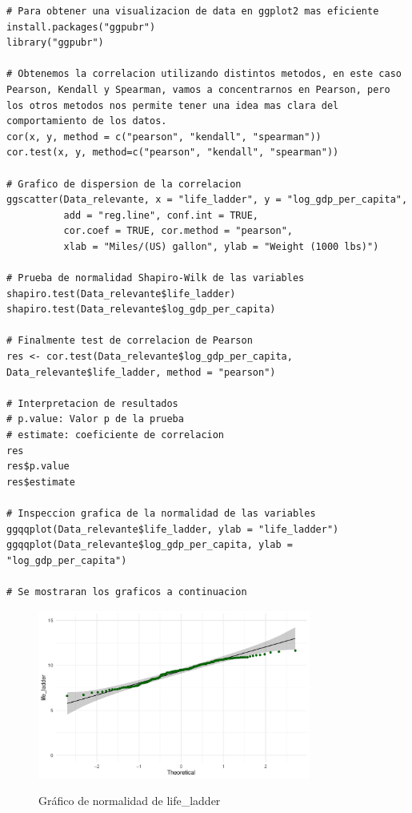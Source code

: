 \begin{enumerate}
\pagebreak

\begin{lstlisting}[caption={Pruebas sobre el coeficiente de correlación lineal de Pearson}, label=lst:rchunk1]
# Para obtener una visualizacion de data en ggplot2 mas eficiente
install.packages("ggpubr")
library("ggpubr")

# Obtenemos la correlacion utilizando distintos metodos, en este caso Pearson, Kendall y Spearman, vamos a concentrarnos en Pearson, pero los otros metodos nos permite tener una idea mas clara del comportamiento de los datos.
cor(x, y, method = c("pearson", "kendall", "spearman"))
cor.test(x, y, method=c("pearson", "kendall", "spearman"))

# Grafico de dispersion de la correlacion
ggscatter(Data_relevante, x = "life_ladder", y = "log_gdp_per_capita", 
          add = "reg.line", conf.int = TRUE, 
          cor.coef = TRUE, cor.method = "pearson",
          xlab = "Miles/(US) gallon", ylab = "Weight (1000 lbs)")

# Prueba de normalidad Shapiro-Wilk de las variables
shapiro.test(Data_relevante$life_ladder) 
shapiro.test(Data_relevante$log_gdp_per_capita)

# Finalmente test de correlacion de Pearson
res <- cor.test(Data_relevante$log_gdp_per_capita, Data_relevante$life_ladder, method = "pearson")

# Interpretacion de resultados
# p.value: Valor p de la prueba
# estimate: coeficiente de correlacion
res
res$p.value
res$estimate

# Inspeccion grafica de la normalidad de las variables
ggqqplot(Data_relevante$life_ladder, ylab = "life_ladder")
ggqqplot(Data_relevante$log_gdp_per_capita, ylab = "log_gdp_per_capita")

# Se mostraran los graficos a continuacion
\end{lstlisting}
\newpage

\begin{figure}[!ht]
    \centering
    \caption{Gráfico de normalidad de life\_ladder}
    \includegraphics[width=0.8\textwidth]{figures/qqp_lgdp.pdf}
    \label{fig:correlaciones2}
\end{figure}


\end{enumerate}
